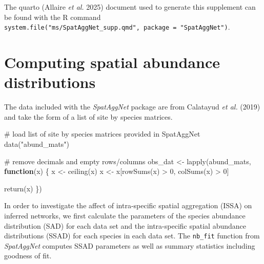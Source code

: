 \documentclass[
  letterpaper,
  DIV=11,
  numbers=noendperiod]{scrartcl}
\newenvironment{Shaded}{\begin{snugshade}}{\end{snugshade}}
\newcommand{\CommentTok}[1]{\textcolor[rgb]{0.37,0.37,0.37}{#1}}
\newcommand{\ControlFlowTok}[1]{\textcolor[rgb]{0.00,0.23,0.31}{\textbf{#1}}}
\newcommand{\DecValTok}[1]{\textcolor[rgb]{0.68,0.00,0.00}{#1}}
\newcommand{\FunctionTok}[1]{\textcolor[rgb]{0.28,0.35,0.67}{#1}}
\newcommand{\NormalTok}[1]{\textcolor[rgb]{0.00,0.23,0.31}{#1}}
\newcommand{\OtherTok}[1]{\textcolor[rgb]{0.00,0.23,0.31}{#1}}
\newcommand{\SpecialCharTok}[1]{\textcolor[rgb]{0.37,0.37,0.37}{#1}}
\newcommand{\StringTok}[1]{\textcolor[rgb]{0.13,0.47,0.30}{#1}}
\begin{document}
The quarto (Allaire \emph{et al.} 2025) document used to generate this
supplement can be found with the R command
\texttt{system.file("ms/SpatAggNet\_supp.qmd",\ package\ =\ "SpatAggNet")}.

\section{Computing spatial abundance
distributions}\label{computing-spatial-abundance-distributions}

The data included with the \emph{SpatAggNet} package are from Calatayud
\emph{et al.} (2019) and take the form of a list of site by species
matrices.

\begin{Shaded}
\begin{Highlighting}[]
\CommentTok{\# load list of site by species matrices provided in SpatAggNet}
\FunctionTok{data}\NormalTok{(}\StringTok{"abund\_mats"}\NormalTok{)}

\CommentTok{\# remove decimals and empty rows/columns}
\NormalTok{obs\_dat }\OtherTok{\textless{}{-}} \FunctionTok{lapply}\NormalTok{(abund\_mats, }\ControlFlowTok{function}\NormalTok{(x) \{}
\NormalTok{    x }\OtherTok{\textless{}{-}} \FunctionTok{ceiling}\NormalTok{(x)}
\NormalTok{    x }\OtherTok{\textless{}{-}}\NormalTok{ x[}\FunctionTok{rowSums}\NormalTok{(x) }\SpecialCharTok{\textgreater{}} \DecValTok{0}\NormalTok{, }\FunctionTok{colSums}\NormalTok{(x) }\SpecialCharTok{\textgreater{}} \DecValTok{0}\NormalTok{]}
    
    \FunctionTok{return}\NormalTok{(x)}
\NormalTok{\})}
\end{Highlighting}
\end{Shaded}

In order to investigate the affect of intra-specific spatial aggregation
(ISSA) on inferred networks, we first calculate the parameters of the
species abundance distribution (SAD) for each data set and the
intra-specific spatial abundance distributions (SSAD) for each species
in each data set. The \texttt{nb\_fit} function from \emph{SpatAggNet}
computes SSAD parameters as well as summary statistics including
goodness of fit.
\end{document}
